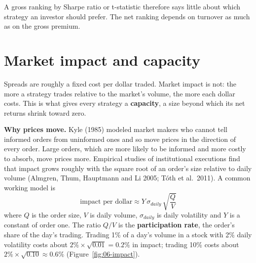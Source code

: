 A gross ranking by Sharpe ratio or t-statistic therefore says little about which strategy an investor should prefer. The net ranking depends on turnover as much as on the gross premium.

\section{Market impact and capacity}
\label{sec:06-capacity}

Spreads are roughly a fixed cost per dollar traded. Market impact is not: the more a strategy trades relative to the market's volume, the more each dollar costs. This is what gives every strategy a \textbf{capacity}, a size beyond which its net returns shrink toward zero.

\textbf{Why prices move.} Kyle (1985) modeled market makers who cannot tell informed orders from uninformed ones and so move prices in the direction of every order. Large orders, which are more likely to be informed and more costly to absorb, move prices more. Empirical studies of institutional executions find that impact grows roughly with the square root of an order's size relative to daily volume (Almgren, Thum, Hauptmann and Li 2005; T\'oth et al.\ 2011). A common working model is
\begin{equation}
  \text{impact per dollar} \approx Y\,\sigma_{daily}\,\sqrt{\frac{Q}{V}}
  \label{eq:06-impact}
\end{equation}
where $Q$ is the order size, $V$ is daily volume, $\sigma_{daily}$ is daily volatility and $Y$ is a constant of order one. The ratio $Q/V$ is the \textbf{participation rate}, the order's share of the day's trading. Trading 1\% of a day's volume in a stock with 2\% daily volatility costs about $2\% \times \sqrt{0.01} = 0.2\%$ in impact; trading 10\% costs about $2\% \times \sqrt{0.10} \approx 0.6\%$ (Figure~\ref{fig:06-impact}).


